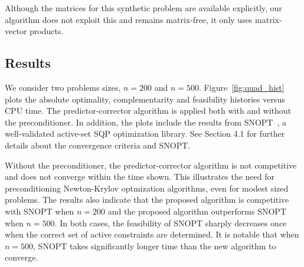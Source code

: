 
\begin{remark}
Although the matrices for this synthetic problem are available explicitly, our
algorithm does not exploit this and remains matrix-free, \ie it only uses
matrix-vector products.
\end{remark}

\subsection{Results}
We consider two problems sizes, $n=200$ and $n=500$. Figure~\ref{fig:quad_hist} plots the absolute optimality, complementarity and feasibility
histories versus CPU time. 
The predictor-corrector algorithm is applied both with and without the preconditioner.  
In addition, the plots include the results
from SNOPT~\cite{gill:2002}, a well-validated active-set SQP
optimization library. See Section 4.1 for further details about the convergence criteria and SNOPT.

Without the preconditioner, the predictor-corrector algorithm is not competitive
and does not converge within the time shown.  This illustrates the need for preconditioning Newton-Krylov
optmization algorithms, even for modest sized problems.  The results
also indicate that the proposed algorithm is competitive with SNOPT when $n=200$ and the proposed algorithm outperforms SNOPT when $n=500$. In both cases, the feasibility of SNOPT sharply 
decreases once when the correct set of active constraints are determined. It is notable that when  $n=500$, SNOPT takes significantly longer time than the new algorithm to converge. 

